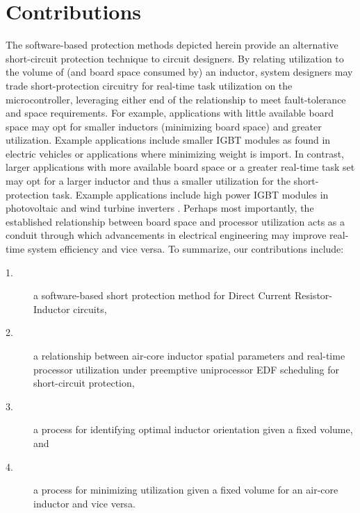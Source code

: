 \documentclass[11pt,oneside]{report}
\begin{document}
    \section{Contributions}
    The software-based protection methods depicted herein provide an alternative short-circuit protection technique to circuit designers. By relating utilization to the volume of (and board space consumed by) an inductor, system designers may trade short-protection circuitry for real-time task utilization on the microcontroller, leveraging either end of the relationship to meet fault-tolerance and space requirements. For example, applications with little available board space may opt for smaller inductors (minimizing board space) and greater utilization. Example applications include smaller IGBT modules as found in electric vehicles or applications where minimizing weight is import\cite{IGBTvehicle}. In contrast, larger applications with more available board space or a greater real-time task set may opt for a larger inductor and thus a smaller utilization for the short-protection task. Example applications include high power IGBT modules in photovoltaic and wind turbine inverters \cite{photoVoltaic}\cite{hiPowerIGBTwind}. Perhaps most importantly, the established relationship between board space and processor utilization acts as a conduit through which advancements in electrical engineering may improve real-time system efficiency and vice versa.
    To summarize, our contributions include:%
    \begin{description}
    \item [1.] a software-based short protection method for Direct Current Resistor-Inductor circuits,
    \item [2.] a relationship between air-core inductor spatial parameters and real-time processor utilization under preemptive uniprocessor EDF scheduling for short-circuit protection,
    \item [3.] a process for identifying optimal inductor orientation given a fixed volume, and
    \item [4.] a process for minimizing utilization given a fixed volume for an air-core inductor and vice versa.
    \end{description}
    
    
\end{document}
